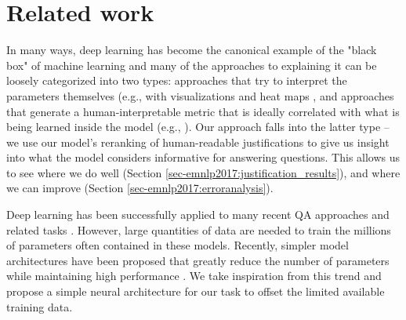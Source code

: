 \section{Related work}

In many ways, deep learning has become the canonical example of the "black box" of machine learning and many of the approaches to explaining it can be loosely categorized into two types: approaches that try to interpret the parameters themselves (e.g., with visualizations and heat maps \citep{Zeiler2014VisualizingAU,nips15_hermann, Li2016VisualizingAU}, and approaches that generate a human-interpretable metric that is ideally correlated with what is being learned inside the model (e.g., \citet{Lei2016RationalizingNP}). Our approach falls into the latter type -- 
we use our model's reranking of human-readable justifications to give us insight into what the model considers informative for answering questions.  This allows us to see where we do well (Section \ref{sec-emnlp2017:justification_results}), and where we can improve (Section  \ref{sec-emnlp2017:erroranalysis}).

Deep learning has been successfully applied to many recent QA approaches and related tasks \cite[][inter alia]{Bordes2015LargescaleSQ,nips15_hermann, He2016CharacterLevelQA, dong2015question, Tan2016ImprovedRL}.
However, large quantities of data are needed to train the millions of parameters often contained in these models.  
Recently, simpler model architectures have been proposed that greatly reduce the number of parameters while maintaining high performance \cite[e.g.,][]{Iyyer2015,chen2016thorough,Parikh2016ADA}.  
We take inspiration from this trend and propose a simple neural architecture for our task to offset the limited available training data. 

